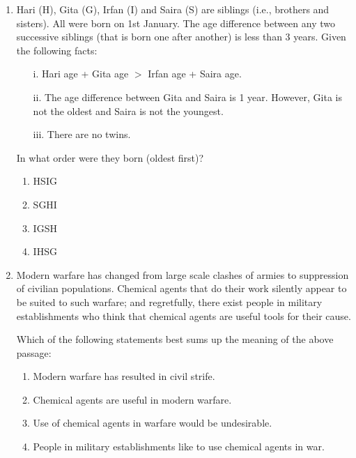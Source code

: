 \documentclass[journal,12pt,onecolumn]{IEEEtran}
\theoremstyle{remark}
\begin{document}
\begin{enumerate}
\begin{enumerate}
\item Hari (H), Gita (G), Irfan (I) and Saira (S) are siblings (i.e., brothers and sisters). All were born on 1st January. The age difference between any two successive siblings (that is born one after another) is less than 3 years. Given the following facts:
\begin{enumerate}
    \item[i.] Hari age + Gita age $> $ Irfan age + Saira age.
    \item[ii.] The age difference between Gita and Saira is 1 year. However, Gita is not the oldest and Saira is not the youngest.
    \item[iii.] There are no twins.
\end{enumerate}
In what order were they born (oldest first)?
\begin{enumerate}
    \item HSIG
    \item SGHI
    \item IGSH
    \item IHSG
\end{enumerate}

\item Modern warfare has changed from large scale clashes of armies to suppression of civilian populations. Chemical agents that do their work silently appear to be suited to such warfare; and regretfully, there exist people in military establishments who think that chemical agents are useful tools for their cause.

Which of the following statements best sums up the meaning of the above passage:
\begin{enumerate}
    \item Modern warfare has resulted in civil strife.
    \item Chemical agents are useful in modern warfare.
    \item Use of chemical agents in warfare would be undesirable.
    \item People in military establishments like to use chemical agents in war.
\end{enumerate}


\end{enumerate}
\end{enumerate}
\end{document}
